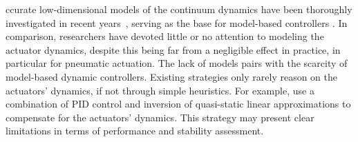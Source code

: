 ccurate low-dimensional models of the continuum dynamics have been thoroughly investigated in recent years~\citep{faure2012sofa, grazioso2019geometrically, sadati2021tmtdyn}, serving as the base for model-based controllers \citep{boyer2020dynamics, della2023model}. 
In comparison, researchers have devoted little or no attention to modeling the actuator dynamics, despite this being far from a negligible effect in practice, in particular for pneumatic actuation. %
%
%
%
The lack of models pairs with the scarcity of model-based dynamic controllers. Existing strategies only rarely reason on the actuators' dynamics, if not through simple heuristics.
%
For example, \citep{lindenroth2016stiffness, marchese2016design, della2020model} use a combination of PID control and inversion of quasi-static linear approximations to compensate for the actuators' dynamics.
%
This strategy may present clear limitations in terms of performance and stability assessment.
%
